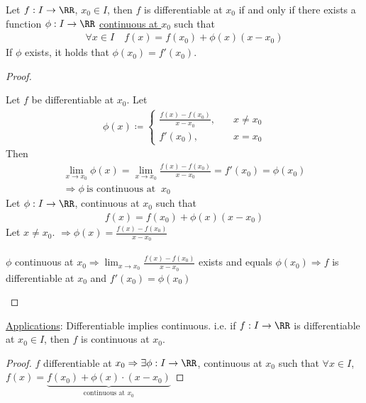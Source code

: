\documentclass[class=scrartcl, crop=false]{standalone}
\begin{document}
\begin{theorem}
  Let $f: I \to \RR$, $x_0 \in I$, then $f$ is differentiable at $x_0$ if and only if there exists a function $\phi: I \to \RR$ \ul{continuous at $x_0$} such that 
  \begin{gather*}
    \forall x \in I \quad f(x) = f(x_0) + \phi(x)(x - x_0)
  \end{gather*} 
  If $\phi$ exists, it holds that $\phi(x_0) = f'(x_0)$.
  \begin{proof}
    \begin{itemize}
      \ii["$\Rightarrow$"]
      Let $f$ be differentiable at $x_0$. Let  
      \begin{gather*}
        \phi(x) \coloneqq
        \begin{cases}
          \frac{f(x) - f(x_0)}{x - x_0}, \quad &x \neq x_0 \\
          f'(x_0), \quad &x = x_0
        \end{cases} 
      \end{gather*} 
      Then 
      \begin{gather*}
        \lim_{x \to x_0}\phi(x) = \lim_{x \to x_0}\frac{f(x) - f(x_0)}{x - x_0} = f'(x_0) = \phi(x_0)
        \\
        \Rightarrow \phi \ \text{is continuous at } \ x_0
      \end{gather*}
      \ii["$\Leftarrow$"]
      Let $\phi: I \to \RR$, continuous at $x_0$ such that 
      \begin{gather*}
        f(x) = f(x_0) + \phi(x)(x - x_0)
      \end{gather*} 
      Let $x \neq x_0$. $\Rightarrow \phi(x) = \frac{f(x) - f(x_0)}{x - x_0}$
      \\\\
      $\phi$ continuous at $x_0 \Rightarrow \lim_{x \to x_0} \frac{f(x) - f(x_0)}{x - x_0}$ exists and equals $\phi(x_0) \Rightarrow f$ is differentiable at $x_0$ and $f'(x_0) = \phi(x_0)$
    \end{itemize} 
  \end{proof}  \noindent
  \ul{Applications}:
  Differentiable implies continuous. i.e. if $f: I \to \RR$ is differentiable at $x_0 \in I$, then $f$ is continuous at $x_0$.
  \begin{proof}
    $f$ differentiable at $x_0 \Rightarrow \exists \phi: I \to \RR$, continuous at $x_0$ such that $\forall x \in I$, $f(x) = \underbrace{f(x_0) + \phi(x) \cdot (x - x_0)}_{\text{continuous at } x_0}$
  \end{proof} 
\end{theorem} 
\end{document}

